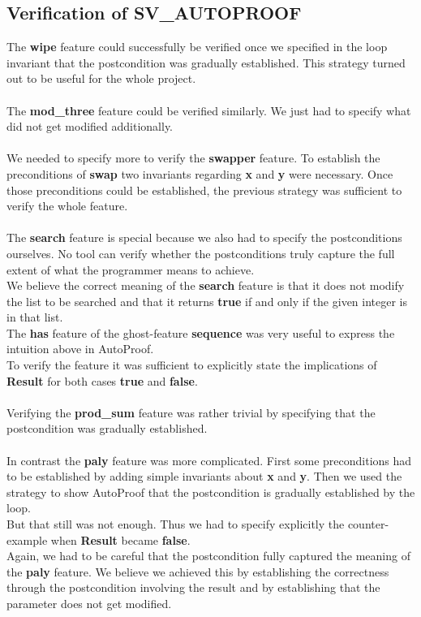 \documentclass{report}
\begin{document}
\subsection{Verification of SV\_AUTOPROOF}

The \textbf{wipe} feature could successfully be verified once we specified in the loop
invariant that the postcondition was gradually established. This strategy
turned out to be useful for the whole project.
\\
\\
The \textbf{mod\_three} feature could be verified similarly. We just had to
specify what did not get modified additionally.
\\
\\
We needed to specify more to verify the \textbf{swapper} feature. To establish
the preconditions of \textbf{swap} two invariants regarding \textbf{x} and
\textbf{y} were necessary. Once those preconditions could be established, the
previous strategy was sufficient to verify the whole feature.
\\
\\
The \textbf{search} feature is special because we also had to specify the 
postconditions ourselves. No tool can verify whether the postconditions truly
capture the full extent of what the programmer means to achieve.\\
We believe the correct meaning of the \textbf{search} feature is that it does
not modify the list to be searched and that it returns \textbf{true} if and only if
the given integer is in that list.\\
The \textbf{has} feature of the ghost-feature \textbf{sequence} was very useful
to express the intuition above in AutoProof.\\
To verify the feature it was sufficient to explicitly state the implications
of \textbf{Result} for both cases \textbf{true} and \textbf{false}.
\\
\\
Verifying the \textbf{prod\_sum} feature was rather trivial by specifying that
the postcondition was gradually established.
\\
\\
In contrast the \textbf{paly} feature was more complicated. First some preconditions
had to be established by adding simple invariants about \textbf{x} and \textbf{y}.
Then we used the strategy to show AutoProof that the postcondition is gradually
established by the loop.\\
But that still was not enough. Thus we had to specify explicitly the counter-example
when \textbf{Result} became \textbf{false}.\\
Again, we had to be careful that the postcondition fully captured the meaning
of the \textbf{paly} feature. We believe we achieved this by establishing the
correctness through the postcondition involving the result and by establishing
that the parameter does not get modified.
\end{document}
